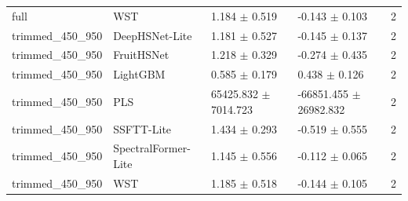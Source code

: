 \begin{table}[t]
\begin{tabular}{lllll}
full & WST & 1.184 $\pm$ 0.519 & -0.143 $\pm$ 0.103 & 2 \\
trimmed\_450\_950 & DeepHSNet-Lite & 1.181 $\pm$ 0.527 & -0.145 $\pm$ 0.137 & 2 \\
trimmed\_450\_950 & FruitHSNet & 1.218 $\pm$ 0.329 & -0.274 $\pm$ 0.435 & 2 \\
trimmed\_450\_950 & LightGBM & 0.585 $\pm$ 0.179 & 0.438 $\pm$ 0.126 & 2 \\
trimmed\_450\_950 & PLS & 65425.832 $\pm$ 7014.723 & -66851.455 $\pm$ 26982.832 & 2 \\
trimmed\_450\_950 & SSFTT-Lite & 1.434 $\pm$ 0.293 & -0.519 $\pm$ 0.555 & 2 \\
trimmed\_450\_950 & SpectralFormer-Lite & 1.145 $\pm$ 0.556 & -0.112 $\pm$ 0.065 & 2 \\
trimmed\_450\_950 & WST & 1.185 $\pm$ 0.518 & -0.144 $\pm$ 0.105 & 2 \\
\hline
\end{tabular}
\end{table}